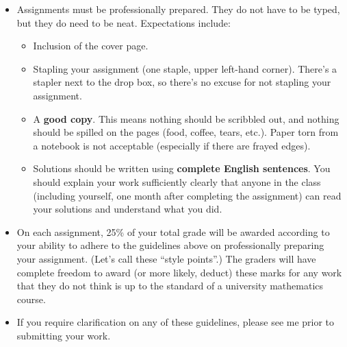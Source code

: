 \documentclass[letterpaper,12pt]{article}
\begin{document}
\begin{itemize}
 \item Assignments must be professionally prepared. They do not have to be typed, but they do need to be neat. Expectations include:
 \begin{itemize}
  \item Inclusion of the cover page.
  \item Stapling your assignment (one staple, upper left-hand corner). There's a stapler next to the drop box, so there's no excuse for not stapling your assignment.
  \item A \textbf{good copy}. This means nothing should be scribbled out, and nothing should be spilled on the pages (food, coffee, tears, etc.). Paper torn from a notebook is not acceptable (especially if there are frayed edges).
  \item Solutions should be written using \textbf{complete English sentences}. You should explain your work sufficiently clearly that anyone in the class (including yourself, one month after completing the assignment) can read your solutions and understand what you did.
 \end{itemize}
  \item On each assignment, 25\% of your total grade will be awarded according to your ability to adhere to the guidelines above on professionally preparing your assignment. (Let's call these ``style points''.) The graders will have complete freedom to award (or more likely, deduct) these marks for any work that they do not think is up to the standard of a university mathematics course.
  \item If you require clarification on any of these guidelines, please see me prior to submitting your work.
\end{itemize}
\end{document}
